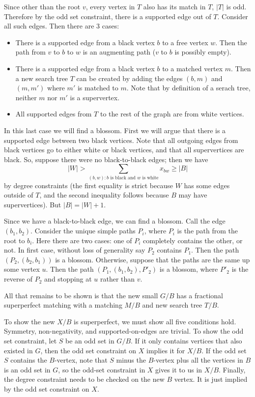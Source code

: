 \documentclass{hmcpset}
\begin{document}
\begin{solution}
\begin{enumerate}
Since other than the root $v$, every vertex in $T$ also has its match in $T$, $|T|$ is odd. Therefore by the odd set constraint, there is a supported edge out of $T$. Consider all such edges. Then there are 3 cases:
\begin{itemize}
\item There is a supported edge from a black vertex $b$ to a free vertex $w$. Then the path from $v$ to $b$ to $w$ is an augmenting path ($v$ to $b$ is possibly empty).
\item There is a supported edge from a black vertex $b$ to a matched vertex $m$. Then a new search tree $T$ can be created by adding the edges $(b,m)$ and $(m, m')$ where $m'$ is matched to $m$. Note that by definition of a serach tree, neither $m$ nor $m'$ is a supervertex.
\item All supported edges from $T$ to the rest of the graph are from white vertices.
\end{itemize}
In this last case we will find a blossom. First we will argue that there is a supported edge between two black vertices. Note that all outgoing edges from black vertices go to either white or black vertices, and that all supervertices are black. So, suppose there were no black-to-black edges; then we have
\[|W| > \sum_{(b,w): \text{$b$ is black and $w$ is white}} x_{bw} \geq |B|\]
by degree constraints (the first equality is strict because $W$ has some edges outside of $T$, and the second inequality follows because $B$ may have supervertices). But $|B| = |W| + 1$.

Since we have a black-to-black edge, we can find a blossom. Call the edge $(b_1, b_2)$. Consider the unique simple paths $P_i$, where $P_i$ is the path from the root to $b_i$. Here there are two cases: one of $P_i$ completely contains the other, or not. In first case, without loss of generality say $P_2$ contains $P_1$. Then the path $(P_2, (b_2,b_1))$ is a blossom. Otherwise, suppose that the paths are the same up some vertex $u$. Then the path $(P_1, (b_1, b_2), P'_2)$ is a blossom, where $P'_2$ is the reverse of $P_2$ and stopping at $u$ rather than $v$.

All that remains to be shown is that the new small $G/B$ has a fractional superperfect matching with a matching $M/B$ and new search tree $T/B$.

To show the new $X/B$ is superperfect, we must show all five conditions hold. Symmetry, non-negativity, and supported-on-edges are trivial. To show the odd set constraint, let $S$ be an odd set in $G/B$. If it only contains vertices that also existed in $G$, then the odd set constraint on $X$ implies it for $X/B$. If the odd set $S$ contains the $B$-vertex, note that $S$ minus the $B$-vertex plus all the vertices in $B$ is an odd set in $G$, so the odd-set constraint in $X$ gives it to us in $X/B$. Finally, the degree constraint needs to be checked on the new $B$ vertex. It is just implied by the odd set constraint on $X$.


\end{enumerate}
\end{solution}
\end{document}
